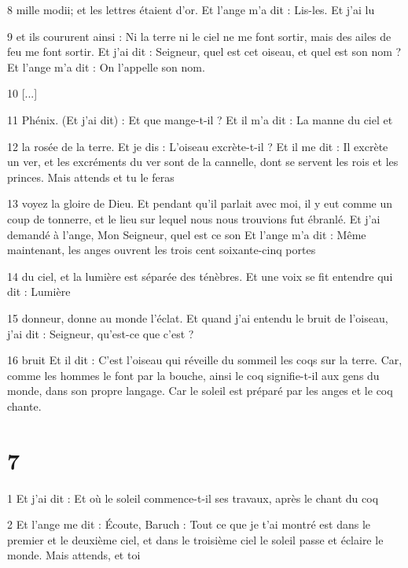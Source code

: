 \par 8 mille modii; et les lettres étaient d'or. Et l'ange m'a dit : Lis-les. Et j'ai lu

\par 9 et ils coururent ainsi : Ni la terre ni le ciel ne me font sortir, mais des ailes de feu me font sortir. Et j'ai dit : Seigneur, quel est cet oiseau, et quel est son nom ? Et l'ange m'a dit : On l'appelle son nom.

\par 10 [...]

\par 11 Phénix. (Et j'ai dit) : Et que mange-t-il ? Et il m'a dit : La manne du ciel et

\par 12 la rosée de la terre. Et je dis : L'oiseau excrète-t-il ? Et il me dit : Il excrète un ver, et les excréments du ver sont de la cannelle, dont se servent les rois et les princes. Mais attends et tu le feras

\par 13 voyez la gloire de Dieu. Et pendant qu'il parlait avec moi, il y eut comme un coup de tonnerre, et le lieu sur lequel nous nous trouvions fut ébranlé. Et j'ai demandé à l'ange, Mon Seigneur, quel est ce son Et l'ange m'a dit : Même maintenant, les anges ouvrent les trois cent soixante-cinq portes

\par 14 du ciel, et la lumière est séparée des ténèbres. Et une voix se fit entendre qui dit : Lumière

\par 15 donneur, donne au monde l'éclat. Et quand j'ai entendu le bruit de l'oiseau, j'ai dit : Seigneur, qu'est-ce que c'est ?

\par 16 bruit Et il dit : C'est l'oiseau qui réveille du sommeil les coqs sur la terre. Car, comme les hommes le font par la bouche, ainsi le coq signifie-t-il aux gens du monde, dans son propre langage. Car le soleil est préparé par les anges et le coq chante.

\chapter{7}

\par 1 Et j'ai dit : Et où le soleil commence-t-il ses travaux, après le chant du coq

\par 2 Et l'ange me dit : Écoute, Baruch : Tout ce que je t'ai montré est dans le premier et le deuxième ciel, et dans le troisième ciel le soleil passe et éclaire le monde. Mais attends, et toi

